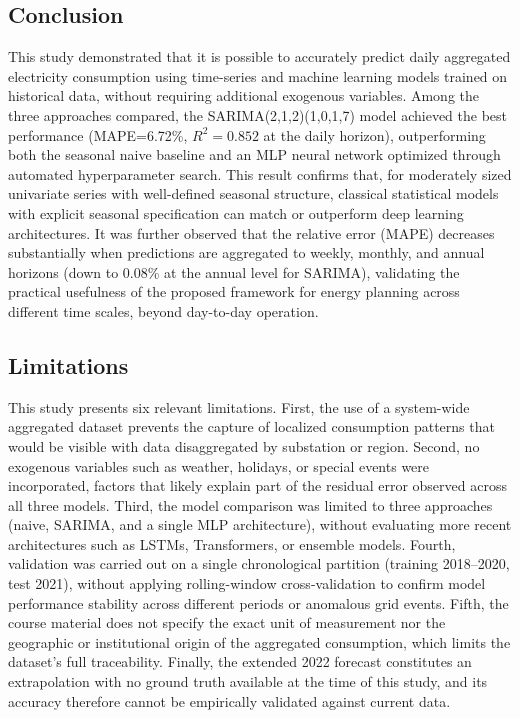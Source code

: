 \documentclass{ieeeaccess}
\begin{document}
\subsection{Conclusion}
This study demonstrated that it is possible to accurately predict daily aggregated electricity consumption using time-series and machine learning models trained on historical data, without requiring additional exogenous variables. Among the three approaches compared, the SARIMA(2,1,2)(1,0,1,7) model achieved the best performance (MAPE=6.72\%, $R^2=0.852$ at the daily horizon), outperforming both the seasonal naive baseline and an MLP neural network optimized through automated hyperparameter search. This result confirms that, for moderately sized univariate series with well-defined seasonal structure, classical statistical models with explicit seasonal specification can match or outperform deep learning architectures. It was further observed that the relative error (MAPE) decreases substantially when predictions are aggregated to weekly, monthly, and annual horizons (down to 0.08\% at the annual level for SARIMA), validating the practical usefulness of the proposed framework for energy planning across different time scales, beyond day-to-day operation.

\subsection{Limitations}
This study presents six relevant limitations. First, the use of a system-wide aggregated dataset prevents the capture of localized consumption patterns that would be visible with data disaggregated by substation or region. Second, no exogenous variables such as weather, holidays, or special events were incorporated, factors that likely explain part of the residual error observed across all three models. Third, the model comparison was limited to three approaches (naive, SARIMA, and a single MLP architecture), without evaluating more recent architectures such as LSTMs, Transformers, or ensemble models. Fourth, validation was carried out on a single chronological partition (training 2018--2020, test 2021), without applying rolling-window cross-validation to confirm model performance stability across different periods or anomalous grid events. Fifth, the course material does not specify the exact unit of measurement nor the geographic or institutional origin of the aggregated consumption, which limits the dataset's full traceability. Finally, the extended 2022 forecast constitutes an extrapolation with no ground truth available at the time of this study, and its accuracy therefore cannot be empirically validated against current data.
\end{document}

